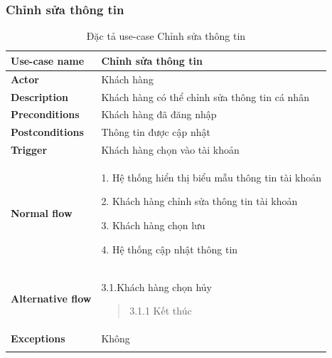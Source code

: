 \subsubsection{Chỉnh sửa thông tin}
{
    \setlength\extrarowheight{6pt}
    \begin{longtable}{| p{} | p{} |}
        \hline
        \textbf{Use-case name}
         &
        Chỉnh sửa thông tin
        \\
        \hline
        \textbf{Actor}
         &
        Khách hàng
        \\
        \hline
        \textbf{Description}
         &
        Khách hàng có thể chỉnh sửa thông tin cá nhân
        \\
        \hline
        \textbf{Preconditions}
         &
        Khách hàng đã đăng nhập
        \\
        \hline
        \textbf{Postconditions}
         &
        Thông tin được cập nhật
        \\
        \hline
        \textbf{Trigger}
         &
        Khách hàng chọn vào tài khoản
        \\
        \hline
        \begin{flushleft}
            \textbf{Normal flow}
        \end{flushleft}
         &
        1. Hệ thống hiển thị biểu mẫu thông tin tài khoản

        2. Khách hàng chỉnh sửa thông tin tài khoản

        3. Khách hàng chọn lưu

        4. Hệ thống cập nhật thông tin
        \\
        \hline
        \begin{flushleft}
            \textbf{Alternative flow}
        \end{flushleft}
         &
        3.1.Khách hàng chọn hủy
        \begin{quote}
            3.1.1 Kết thúc
        \end{quote}
        \\
        \hline
        \textbf{Exceptions}
         &
        Không
        \\
        \hline
        \caption{Đặc tả use-case Chỉnh sửa thông tin}
    \end{longtable}
}

